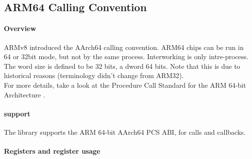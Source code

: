 %
%
%
%

\subsection{ARM64 Calling Convention}

\paragraph{Overview}

ARMv8 introduced the AArch64 calling convention. ARM64 chips can be run in 64 or 32bit mode, but not by the same process. Interworking is only intre-process.\\
The word size is defined to be 32 bits, a dword 64 bits. Note that this is due to historical reasons (terminology
didn't change from ARM32).\\
For more details, take a look at the Procedure Call Standard for the ARM 64-bit Architecture \cite{AAPCS64}.


\paragraph{ support}

The  library supports the ARM 64-bit AArch64 PCS ABI, for calls and callbacks.


\paragraph{Registers and register usage}

